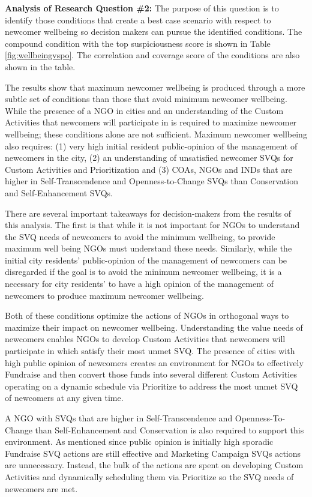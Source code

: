\documentclass{scspaperproc}
\theoremstyle{scsthe}
\begin{document}
{\bf Analysis of Research Question \#2:} The purpose of this question is to identify those conditions that create a best case scenario with respect to newcomer wellbeing so decision makers can pursue the identified conditions. The compound condition with the top suspiciousness score is shown in Table \ref{fig:wellbeingvspo}. The correlation and coverage score of the conditions are also shown in the table. 

The results show that maximum newcomer wellbeing is produced through a more subtle set of conditions than those that avoid minimum newcomer wellbeing. While the presence of a NGO in cities and an understanding of the Custom Activities that newcomers will participate in is required to maximize newcomer wellbeing; these conditions alone are not sufficient. Maximum newcomer wellbeing also requires: (1) very high initial resident public-opinion of the management of newcomers in the city, (2) an understanding of unsatisfied newcomer SVQs for Custom Activities and Prioritization and (3) COAs, NGOs and INDs that are higher in Self-Transcendence and Openness-to-Change SVQs than Conservation and Self-Enhancement SVQs.

There are several important takeaways for decision-makers from the results of this analysis. The first is that while it is not important for NGOs to understand the SVQ needs of newcomers to avoid the minimum wellbeing, to provide maximum well being NGOs must understand these needs. Similarly, while the initial city residents' public-opinion of the management of newcomers can be disregarded if the goal is to avoid the minimum newcomer wellbeing, it is a necessary for city residents' to have a high opinion of the management of newcomers to produce maximum newcomer wellbeing. 

Both of these conditions optimize the actions of NGOs in orthogonal ways to maximize their impact on newcomer wellbeing. Understanding the value needs of newcomers enables NGOs to develop Custom Activities that newcomers will participate in which satisfy their most unmet SVQ. The presence of cities with high public opinion of newcomers creates an environment for NGOs to effectively Fundraise and then convert those funds into several different Custom Activities operating on a dynamic schedule via Prioritize to address the most unmet SVQ of newcomers at any given time. 

A NGO with SVQs that are higher in Self-Transcendence and Openness-To-Change than Self-Enhancement and Conservation is also required to support this environment. As mentioned since public opinion is initially high sporadic Fundraise SVQ actions are still effective and Marketing Campaign SVQs actions are unnecessary. Instead, the bulk of the actions are spent on developing Custom Activities and dynamically scheduling them via Prioritize so the SVQ needs of newcomers are met. 
\end{document}
